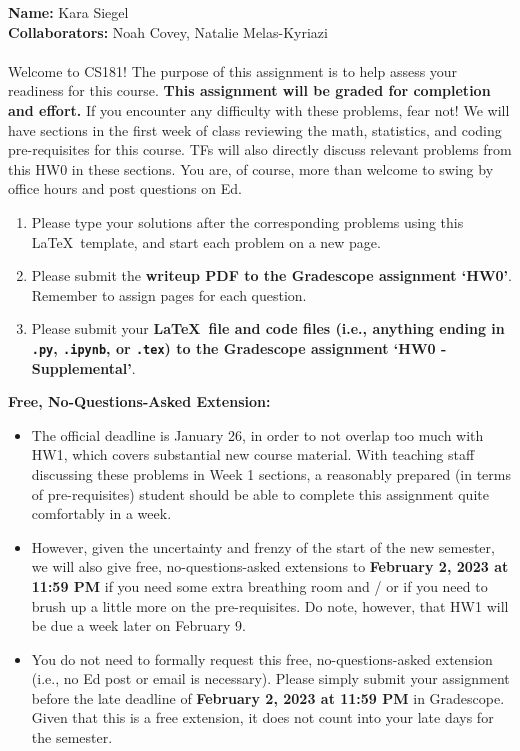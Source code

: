 \documentclass{harvardml}
\theoremstyle{definition}
\theoremstyle{plain}
\begin{document}
\noindent \textbf{Name:} Kara Siegel\\
\textbf{Collaborators:} Noah Covey, Natalie Melas-Kyriazi\\
\\
\noindent Welcome to CS181! The purpose of this assignment is to help assess your readiness for this course. \textbf{This assignment will be graded for completion and effort.} If you encounter any difficulty with these problems, fear not! We will have sections in the first week of class reviewing the math, statistics, and coding pre-requisites for this course. TFs will also directly discuss relevant problems from this HW0 in these sections. You are, of course, more than welcome to swing by office hours and post questions on Ed.

\begin{enumerate}
    \item Please type your solutions after the corresponding problems using this \LaTeX\ template, and start each problem on a new page.
    \item Please submit the \textbf{writeup PDF to the Gradescope assignment `HW0'}. Remember to assign pages for each question.
    \item Please submit your \textbf{\LaTeX\ file and code files (i.e., anything ending in \texttt{.py}, \texttt{.ipynb}, or \texttt{.tex}) to the Gradescope assignment `HW0 - Supplemental'}. 
\end{enumerate}

\noindent \textbf{Free, No-Questions-Asked Extension:}
\begin{itemize}
    \item The official deadline is January 26, in order to not overlap too much with HW1, which covers substantial new course material. With teaching staff discussing these problems in Week 1 sections, a reasonably prepared (in terms of pre-requisites) student should be able to complete this assignment quite comfortably in a week.
    \item However, given the uncertainty and frenzy of the start of the new semester, we will also give free, no-questions-asked extensions to \textbf{February 2, 2023 at 11:59 PM} if you need some extra breathing room and / or if you need to brush up a little more on the pre-requisites. Do note, however, that HW1 will be due a week later on February 9.
    \item You do not need to formally request this free, no-questions-asked extension (i.e., no Ed post or email is necessary). Please simply submit your assignment before the late deadline of \textbf{February 2, 2023 at 11:59 PM} in Gradescope. Given that this is a free extension, it does not count into your late days for the semester.
\end{itemize}
\end{document}
